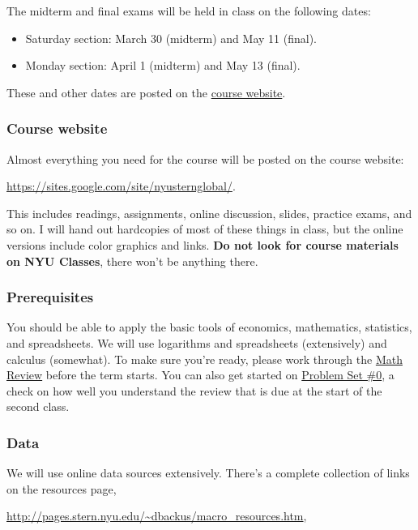 \documentclass[12pt]{article}
\begin{document}
The midterm and final exams will be held in class on the following dates:
%
\begin{itemize}
\item Saturday section:  March 30 (midterm) and May 11 (final).
\item Monday section:  April 1 (midterm) and May 13 (final).
\end{itemize}
These and other dates are posted on the
\href{https://sites.google.com/site/nyusternglobal/home/outline}{course website}.

\subsubsection*{Course website}

Almost everything you need for the course will be posted on the course website:

\vspace*{\parskip}
\centerline{\url{https://sites.google.com/site/nyusternglobal/}.}

This includes readings, assignments, online discussion,
slides, practice exams, and so on.
I will hand out hardcopies of most of these things in class,
but the online versions include color graphics and links.
{\bf Do not look for course materials on NYU Classes},
there won't be anything there.

\subsubsection*{Prerequisites}

You should be able to apply the basic tools of economics,
mathematics, statistics, and spreadsheets.  We will use
logarithms and spreadsheets (extensively) and calculus (somewhat).
To make sure you're ready,
please work through the
\href{http://www.stern.nyu.edu/~dbackus/2303/notes_math.pdf}{Math Review}
before the term starts.
You can also get started on
\href{http://www.stern.nyu.edu/~dbackus/2303/ps0_s13.pdf}{Problem Set \#0},
a check on how well you understand the review
that is due at the start of the second class.

\subsubsection*{Data}

We will use online data sources extensively.
There's a complete collection of links on the resources page,

\vspace*{\parskip}
\centerline{\url{http://pages.stern.nyu.edu/~dbackus/macro_resources.htm},}
\end{document}

